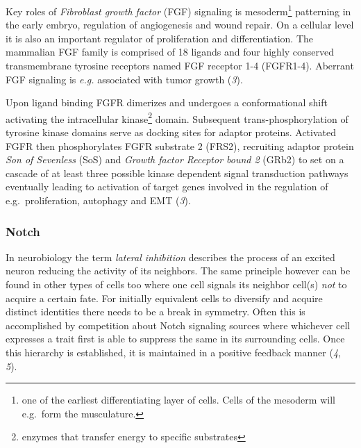 \documentclass[11pt,singlespacinge,twoside]{reedthesis} %
\theoremstyle{definition}
\theoremstyle{definition}
\theoremstyle{definition}
\theoremstyle{remark}
\begin{document}
Key roles of \emph{Fibroblast growth factor} (FGF) signaling is mesoderm\footnote{one of the earliest differentiating layer of cells. Cells of the mesoderm will e.g.~form the musculature.} patterning in the early embryo, regulation of angiogenesis and wound repair. On a cellular level it is also an important regulator of proliferation and differentiation. The mammalian FGF family is comprised of 18 ligands and four highly conserved transmembrane tyrosine receptors named FGF receptor 1-4 (FGFR1-4). Aberrant FGF signaling is \emph{e.g.} associated with tumor growth (\emph{3}).

Upon ligand binding FGFR dimerizes and undergoes a conformational shift activating the intracellular kinase\footnote{enzymes that transfer energy to specific substrates} domain. Subsequent trans-phosphorylation of tyrosine kinase domains serve as docking sites for adaptor proteins. Activated FGFR then phosphorylates FGFR substrate 2 (FRS2), recruiting adaptor protein \emph{Son of Sevenless} (SoS) and \emph{Growth factor Receptor bound 2} (GRb2) to set on a cascade of at least three possible kinase dependent signal transduction pathways eventually leading to activation of target genes involved in the regulation of e.g.~proliferation, autophagy and EMT (\emph{3}).

\hypertarget{intro-notch}{%
\subsubsection{Notch}\label{intro-notch}}

In neurobiology the term \emph{lateral inhibition} describes the process of an excited neuron reducing the activity of its neighbors. The same principle however can be found in other types of cells too where one cell signals its neighbor cell(s) \emph{not} to acquire a certain fate. For initially equivalent cells to diversify and acquire distinct identities there needs to be a break in symmetry. Often this is accomplished by competition about Notch signaling sources where whichever cell expresses a trait first is able to suppress the same in its surrounding cells. Once this hierarchy is established, it is maintained in a positive feedback manner (\emph{4}, \emph{5}).
\end{document}

